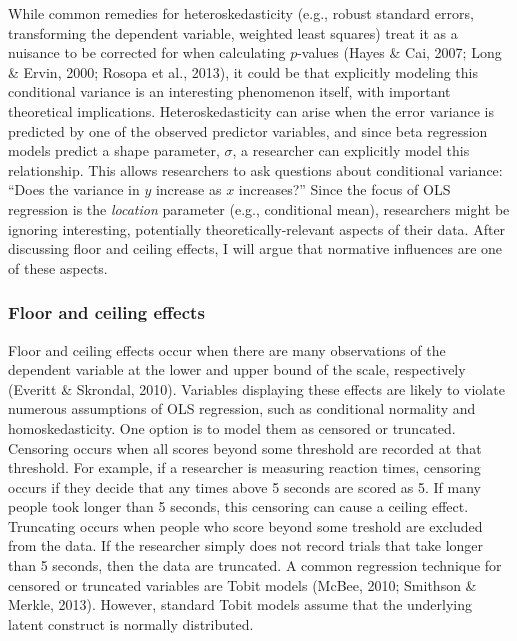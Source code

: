 \documentclass[english,man]{apa6}
\theoremstyle{definition}
\theoremstyle{definition}
\theoremstyle{remark}
\begin{document}
While common remedies for heteroskedasticity (e.g., robust standard
errors, transforming the dependent variable, weighted least squares)
treat it as a nuisance to be corrected for when calculating \(p\)-values
(Hayes \& Cai, 2007; Long \& Ervin, 2000; Rosopa et al., 2013), it could
be that explicitly modeling this conditional variance is an interesting
phenomenon itself, with important theoretical implications.
Heteroskedasticity can arise when the error variance is predicted by one
of the observed predictor variables, and since beta regression models
predict a shape parameter, \(\sigma\), a researcher can explicitly model
this relationship. This allows researchers to ask questions about
conditional variance: \enquote{Does the variance in \(y\) increase as
\(x\) increases?} Since the focus of OLS regression is the
\emph{location} parameter (e.g., conditional mean), researchers might be
ignoring interesting, potentially theoretically-relevant aspects of
their data. After discussing floor and ceiling effects, I will argue
that normative influences are one of these aspects.

\subsubsection{Floor and ceiling
effects}\label{floor-and-ceiling-effects}

Floor and ceiling effects occur when there are many observations of the
dependent variable at the lower and upper bound of the scale,
respectively (Everitt \& Skrondal, 2010). Variables displaying these
effects are likely to violate numerous assumptions of OLS regression,
such as conditional normality and homoskedasticity. One option is to
model them as censored or truncated. Censoring occurs when all scores
beyond some threshold are recorded at that threshold. For example, if a
researcher is measuring reaction times, censoring occurs if they decide
that any times above 5 seconds are scored as 5. If many people took
longer than 5 seconds, this censoring can cause a ceiling effect.
Truncating occurs when people who score beyond some treshold are
excluded from the data. If the researcher simply does not record trials
that take longer than 5 seconds, then the data are truncated. A common
regression technique for censored or truncated variables are Tobit
models (McBee, 2010; Smithson \& Merkle, 2013). However, standard Tobit
models assume that the underlying latent construct is normally
distributed.
\end{document}

